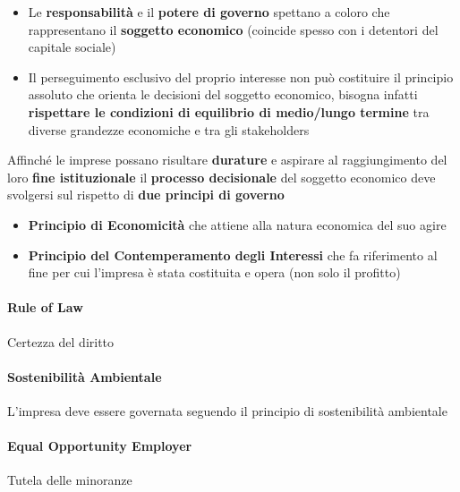 \documentclass[12pt]{article}
\begin{document}
\begin{itemize}
    \item Le \textbf{responsabilità} e il \textbf{potere di governo} spettano a coloro che rappresentano il \textbf{soggetto economico} (coincide spesso con i detentori del capitale sociale)
    \item Il perseguimento esclusivo del proprio interesse non può costituire il principio assoluto che orienta le decisioni del soggetto economico, bisogna infatti \textbf{rispettare le condizioni di equilibrio di medio/lungo termine} tra diverse grandezze economiche e tra gli stakeholders
\end{itemize}
Affinché le imprese possano risultare \textbf{durature} e aspirare al raggiungimento del loro \textbf{fine istituzionale} il \textbf{processo decisionale} del soggetto economico deve svolgersi sul rispetto di \textbf{due principi di governo}
\begin{itemize}
    \item \textbf{Principio di Economicità} che attiene alla natura economica del suo agire
    \item \textbf{Principio del Contemperamento degli Interessi} che fa riferimento al fine per cui l'impresa è stata costituita e opera (non solo il profitto)
\end{itemize}

\paragraph{Rule of Law} Certezza del diritto
\paragraph{Sostenibilità Ambientale} L'impresa deve essere governata seguendo il principio di sostenibilità ambientale
\paragraph{Equal Opportunity Employer} Tutela delle minoranze
\end{document}
